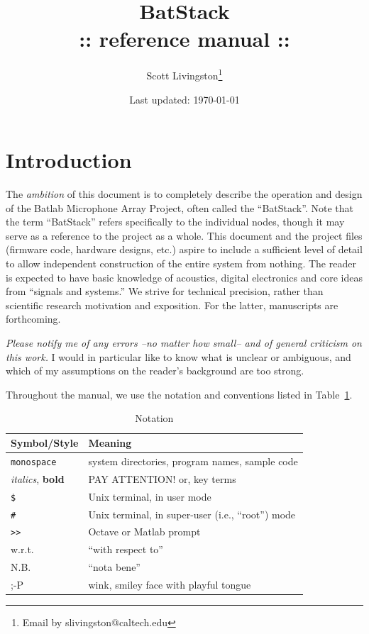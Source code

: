 \documentclass[letterpaper]{article}
\title{BatStack\\ :: reference manual ::}
\author{Scott Livingston\footnote{Email by slivingston@caltech.edu}}
\date{{\small Last updated:} \today}
\begin{document}
\maketitle
\tableofcontents
\newpage
\listoffigures
\listoftables
\newpage


\section{Introduction}

The \textit{ambition} of this document is to completely describe the
operation and design of the Batlab Microphone Array Project, often
called the ``BatStack''. Note that the term ``BatStack'' refers
specifically to the individual nodes, though it may serve as a
reference to the project as a whole. This document and the project
files (firmware code, hardware designs, etc.) aspire to include a
sufficient level of detail to allow independent construction of the
entire system from nothing.  The reader is expected to have basic
knowledge of acoustics, digital electronics and core ideas from
``signals and systems.'' We strive for technical precision, rather than
scientific research motivation and exposition.  For the latter,
manuscripts are forthcoming.

\textit{Please notify me of any errors --no matter how small-- and of
  general criticism on this work.} I would in particular like to know
what is unclear or ambiguous, and which of my assumptions on the
reader's background are too strong.

Throughout the manual, we use the notation and conventions listed in
\mbox{Table \ref{notation:tbl}}.

\begin{table}[h]
\caption{Notation}
\label{notation:tbl}
\centering
\begin{tabular}{|l|l|}
\hline
\textbf{Symbol/Style}&\textbf{Meaning}\\
\hline
\hline
\texttt{monospace} & system directories, program names, sample code\\
\hline
\textit{italics}, \textbf{bold} & PAY ATTENTION! or, key terms\\
\hline
\texttt{\$} & Unix terminal, in user mode\\
\hline
\texttt{\#} & Unix terminal, in super-user (i.e., ``root'') mode\\
\hline
\texttt{>> } & Octave or Matlab prompt\\
\hline
w.r.t. & ``with respect to''\\
\hline
N.B. & ``nota bene''\\
\hline
;-P & wink, smiley face with playful tongue\\
\end{tabular}
\end{table}
\end{document}

